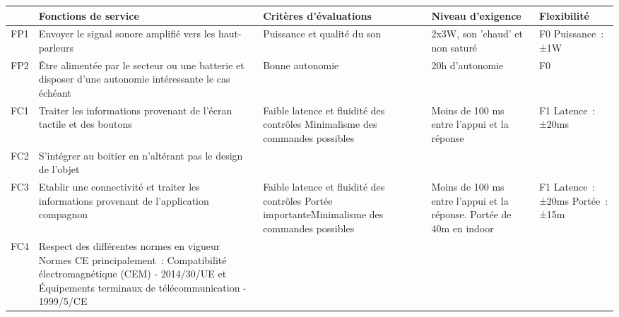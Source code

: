\begin{sidewaystable}[H]
\begingroup{}
\def\tabularxcolumn#1{m{#1}}

\begin{tabularx}{\textwidth}{|X|X|X|X|X|}
\hline
\rowcolor[HTML]{5B9BD5} 
    & Fonctions de service
    & Critères d'évaluations
    & Niveau d'exigence
    & Flexibilité
    \\ \hline
FP1
  & Envoyer le signal sonore amplifié vers les haut-parleurs
  & Puissance et qualité du son 
  & 2x3W, son 'chaud' et non saturé
  & F0 \newline Puissance~:±1W 
  \\ \hline

\rowcolor[HTML]{ACCCEA} 
FP2
  & Être alimentée par le secteur ou une batterie  et disposer d'une autonomie intéressante le cas échéant
  & Bonne autonomie 
  & 20h d'autonomie
  & F0
  \\ \hline
  

FC1
  & Traiter les informations
    provenant de l'écran tactile et des boutons
  & Faible latence et fluidité des contrôles
  	\newline Minimalisme des commandes possibles 
    
  & Moins de 100 ms entre l'appui et la réponse 
  & F1 \newline Latence~: ±20ms
  \\ \hline

\rowcolor[HTML]{ACCCEA} 
FC2
  & S'intégrer au boitier en n'altérant pas le design de l'objet 
  &            
  & 
  & 
  \\ \hline
  
FC3
  & Etablir une connectivité et traiter les informations provenant de l'application compagnon
  & Faible latence et fluidité des contrôles
    \newline Portée importanteMinimalisme des commandes possibles
  & Moins de 100 ms entre l'appui et la réponse.
    \newline Portée de 40m en indoor
  & F1 \newline Latence~: ±20ms \newline Portée~: ±15m
  \\ \hline

\rowcolor[HTML]{ACCCEA} 
FC4
  & Respect des différentes normes en vigueur
   \newline Normes CE principalement~:
   \newline Compatibilité électromagnétique (CEM) - 2014/30/UE 
   \newline et Équipements terminaux de télécommunication - 1999/5/CE


\end{tabularx}
\end{sidewaystable}
